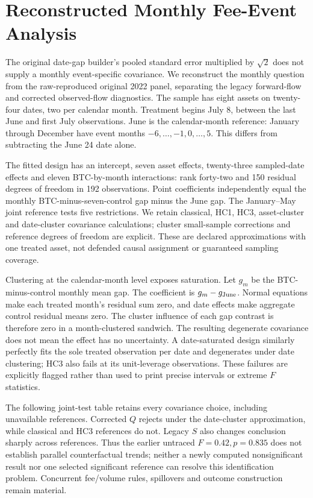 \section{Reconstructed Monthly Fee-Event Analysis}
\label{sec:monthly_event_rebuilt}
The original date-gap builder's pooled standard error multiplied by $\sqrt2$ does not supply a monthly event-specific covariance. We reconstruct the monthly question from the raw-reproduced original 2022 panel, separating the legacy forward-flow and corrected observed-flow diagnostics. The sample has eight assets on twenty-four dates, two per calendar month. Treatment begins July 8, between the last June and first July observations. June is the calendar-month reference: January through December have event months $-6,\ldots,-1,0,\ldots,5$. This differs from subtracting the June 24 date alone.

The fitted design has an intercept, seven asset effects, twenty-three sampled-date effects and eleven BTC-by-month interactions: rank forty-two and 150 residual degrees of freedom in 192 observations. Point coefficients independently equal the monthly BTC-minus-seven-control gap minus the June gap. The January--May joint reference tests five restrictions. We retain classical, HC1, HC3, asset-cluster and date-cluster covariance calculations; cluster small-sample corrections and reference degrees of freedom are explicit. These are declared approximations with one treated asset, not defended causal assignment or guaranteed sampling coverage.

Clustering at the calendar-month level exposes saturation. Let $g_m$ be the BTC-minus-control monthly mean gap. The coefficient is $g_m-g_{\rm June}$. Normal equations make each treated month's residual sum zero, and date effects make aggregate control residual means zero. The cluster influence of each gap contrast is therefore zero in a month-clustered sandwich. The resulting degenerate covariance does not mean the effect has no uncertainty. A date-saturated design similarly perfectly fits the sole treated observation per date and degenerates under date clustering; HC3 also fails at its unit-leverage observations. These failures are explicitly flagged rather than used to print precise intervals or extreme $F$ statistics.

The following joint-test table retains every covariance choice, including unavailable references. Corrected $Q$ rejects under the date-cluster approximation, while classical and HC3 references do not. Legacy $S$ also changes conclusion sharply across references. Thus the earlier untraced $F=0.42,p=0.835$ does not establish parallel counterfactual trends; neither a newly computed nonsignificant result nor one selected significant reference can resolve this identification problem. Concurrent fee/volume rules, spillovers and outcome construction remain material.

